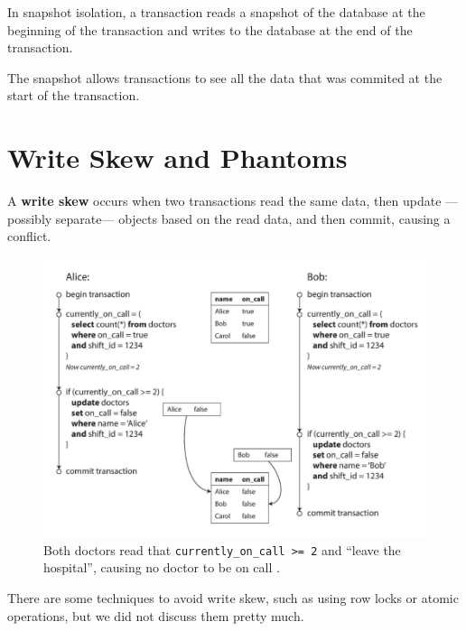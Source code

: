 In snapshot isolation, a transaction reads a snapshot of the database at the beginning of the transaction and writes to the database at the end of the transaction.

The snapshot allows transactions to see all the data that was commited at the start of the transaction.



\section{Write Skew and Phantoms}

\begin{paracol}{2}
   
   \begin{definition}
      A \textbf{write skew} occurs when two transactions read the same data, then update ---possibly separate--- objects based on the read data, and then commit, causing a conflict.
   \end{definition}
   
   \switchcolumn

   \begin{figure}[htbp]
      \centering
      \includegraphics{images/12/write_skew.png}
      \caption{Both doctors read that \lstinline|currently_on_call >= 2| and ``leave the hospital'', causing no doctor to be on call \frownie.}
      \label{fig:12/write_skew}
   \end{figure}
\end{paracol}

There are some techniques to avoid write skew, such as using row locks or atomic operations, but we did not discuss them pretty much.


